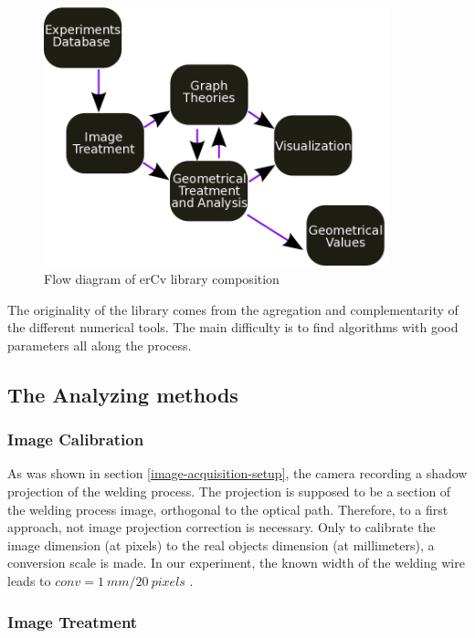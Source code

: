\documentclass[12pt]{iopart}
\begin{document}
\begin{figure}
\begin{center}
\includegraphics[width=10cm]{images/schema-erCv.png}
\caption{{\small Flow diagram of erCv library composition}}
\label{schema-erCv}
\end{center}
\end{figure}

The originality of the library comes from the agregation 
and complementarity of the different numerical tools.
The main difficulty is to find algorithms with good parameters all along the process.

\subsection{ The Analyzing methods}
\label{ the-analyze-methods}
\subsubsection{ Image Calibration}

As was shown in section \ref{image-acquisition-setup}, the camera recording a 
shadow projection of the welding process. The projection is 
supposed to be a section of the welding process image, orthogonal to the optical path.
Therefore, to a first approach, not image projection 
correction is necessary. Only to calibrate the image dimension 
(at pixels) to the real objects dimension (at millimeters), a conversion scale is 
made. In our experiment, the known width of the welding wire leads to $conv = 1\ mm/ 20\ pixels$ . 
  
  
\subsubsection{ Image Treatment}
\label{ image_treatment}
\end{document}
